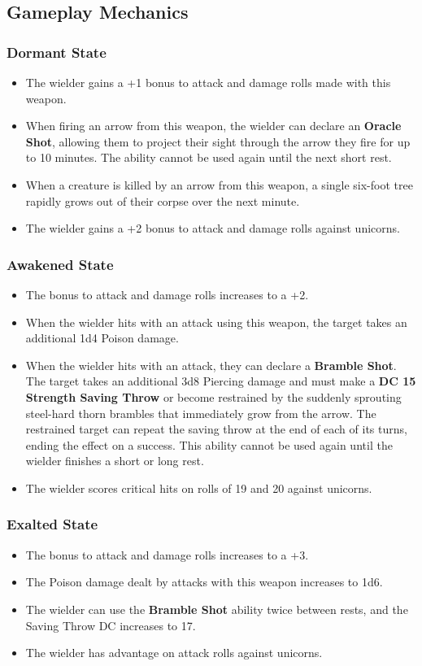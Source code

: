 \subsection*{Gameplay Mechanics}
{\entryfont
\subsubsection*{Dormant State}
\begin{itemize}
	\item The wielder gains a +1 bonus to attack and damage rolls made with this weapon.
	\item When firing an arrow from this weapon, the wielder can declare an \textbf{Oracle Shot}, allowing them to project their sight through the arrow they fire for up to 10 minutes. The ability cannot be used again until the next short rest.
	\item When a creature is killed by an arrow from this weapon, a single six-foot tree rapidly grows out of their corpse over the next minute.
	\item The wielder gains a +2 bonus to attack and damage rolls against unicorns.
\end{itemize}
\subsubsection*{Awakened State}
\begin{itemize}
	\item The bonus to attack and damage rolls increases to a +2.
	\item When the wielder hits with an attack using this weapon, the target takes an additional 1d4 Poison damage.
	\item When the wielder hits with an attack, they can declare a \textbf{Bramble Shot}. The target takes an additional 3d8 Piercing damage and must make a \textbf{DC 15 Strength Saving Throw} or become restrained by the suddenly sprouting steel-hard thorn brambles that immediately grow from the arrow. The restrained target can repeat the saving throw at the end of each of its turns, ending the effect on a success. This ability cannot be used again until the wielder finishes a short or long rest.
	\item The wielder scores critical hits on rolls of 19 and 20 against unicorns.
\end{itemize}
\subsubsection*{Exalted State}
\begin{itemize}
	\item The bonus to attack and damage rolls increases to a +3.
	\item The Poison damage dealt by attacks with this weapon increases to 1d6.
	\item The wielder can use the \textbf{Bramble Shot} ability twice between rests, and the Saving Throw DC increases to 17.
	\item The wielder has advantage on attack rolls against unicorns.
\end{itemize}}